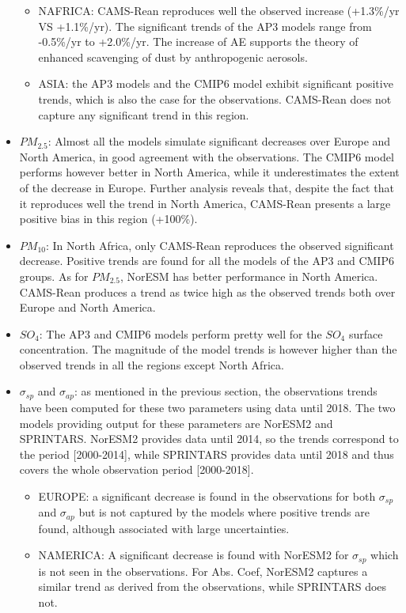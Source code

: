 \documentclass[journal abbreviation, manuscript]{copernicus}
\begin{document}
\begin{itemize}
\begin{itemize}
        \item NAFRICA: CAMS-Rean reproduces well the observed increase (+1.3\%/yr VS +1.1\%/yr). The significant trends of the AP3 models range from -0.5\%/yr to +2.0\%/yr. The increase of AE supports the theory of enhanced scavenging of dust by anthropogenic aerosols.
        \item ASIA: the AP3 models and the CMIP6 model exhibit significant positive trends, which is also the case for the observations. CAMS-Rean does not capture any significant trend in this region.
       \end{itemize}
 \item $PM_{2.5}$: Almost all the models simulate significant decreases over Europe and North America, in good agreement with the observations. The CMIP6 model performs however better in North America, while it underestimates the extent of the decrease in Europe. Further analysis reveals that, despite the fact that it reproduces well the trend in North America, CAMS-Rean presents a large positive bias in this region (+100\%).
 \item $PM_{10}$: In North Africa, only CAMS-Rean reproduces the observed significant decrease. Positive trends are found for all the models of the AP3 and CMIP6 groups. As for $PM_{2.5}$, NorESM has better performance in North America. CAMS-Rean produces a trend as twice high as the observed trends both over Europe and North America.
 \item $SO_{4}$: The AP3 and CMIP6 models perform pretty well for the $SO_{4}$ surface concentration. The magnitude of the model trends is however higher than the observed trends in all the regions except North Africa.
 \item $\sigma_{sp}$ and $\sigma_{ap}$:  as mentioned in the previous section, the observations trends have been computed for these two parameters using data until 2018. The two models providing output for these parameters are NorESM2 and SPRINTARS. NorESM2 provides data until 2014, so the trends correspond to the period [2000-2014], while SPRINTARS provides data until 2018 and thus covers the whole observation period [2000-2018].
       \begin{itemize}
        \item EUROPE: a significant decrease is found in the observations for both $\sigma_{sp}$ and $\sigma_{ap}$ but is not captured by the models where positive trends are found, although associated with large uncertainties.
        \item NAMERICA: A significant decrease is found with NorESM2 for $\sigma_{sp}$ which is not seen in the observations. For Abs. Coef, NorESM2 captures a similar trend as derived from the observations, while SPRINTARS does not.
       \end{itemize}
\end{itemize}
\end{document}
